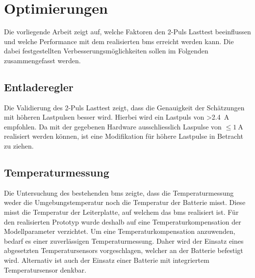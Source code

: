 \section{Optimierungen}
Die vorliegende Arbeit zeigt auf, welche Faktoren den 2-Puls Lasttest
beeinflussen und  welche Performance mit dem realisierten \gls{bms}
erreicht werden kann. Die dabei festgestellten Verbesserungsmöglichkeiten
sollen im Folgenden zusammengefasst werden.

\subsection{Entladeregler}
Die Validierung des 2-Puls Lasttest zeigt, dass die Genauigkeit der
Schätzungen mit höheren Lastpulsen besser wird. Hierbei wird ein
Lastpuls von \SI{>2.4}{\ampere} empfohlen. Da mit der gegebenen
Hardware ausschliesslich Laspulse von $\leq \SI{1}{\ampere}$ realisiert
werden können, ist eine Modifikation für höhere Lastpulse in Betracht
zu ziehen.

\subsection{Temperaturmessung}
Die Untersuchung des bestehenden \gls{bms} zeigte, dass die
Temperaturmessung weder die Umgebungstemperatur noch die Temperatur
der Batterie misst. Diese misst die Temperatur der Leiterplatte,
auf welchem das \gls{bms} realisiert ist. Für den realisierten
Prototyp wurde deshalb auf eine Temperaturkompensation der
Modellparameter verzichtet. Um eine Temperaturkompensation
anzuwenden, bedarf es einer zuverlässigen Temperaturmessung.
Daher wird der Einsatz eines abgesetzten Temperatursensors
vorgeschlagen, welcher an der Batterie befestigt wird. Alternativ
ist auch der Einsatz einer Batterie mit integriertem
Temperatursensor denkbar.
